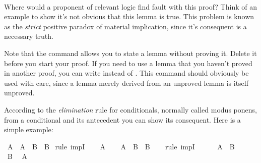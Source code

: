 \begin{isabellebody}
\isadelimproof
\ %
\endisadelimproof
%
\isatagproof
{}\isamarkupfalse%
%
\endisatagproof
{\isafoldproof}%
%
\isadelimproof
%
\endisadelimproof
%
\begin{isamarkuptext}%
Where would a proponent of relevant logic find fault with this proof? Think of an example
to show it's not obvious that this lemma is true. This problem is known as the \emph{strict} positive
paradox of material implication, since it's consequent  is a necessary truth.%
\end{isamarkuptext}\isamarkuptrue%
%
\begin{isamarkuptext}%
Note that the command  allows you to state a lemma without proving it. Delete 
it before you start your proof. If you need to use a lemma that you haven't proved in another proof, you can
write  instead of . This command should obviously be used with care,
since a lemma merely derived from an unproved lemma is itself unproved.%
\end{isamarkuptext}\isamarkuptrue%
%
\isamarkuptrue%
%
\begin{isamarkuptext}%
According to the \emph{elimination} rule for conditionals, normally called modus ponens,
from a conditional and its antecedent you can show its consequent. Here is a simple example:%
\end{isamarkuptext}\isamarkuptrue%
\isamarkupfalse%
\ {\isachardoublequoteopen}A\ {\isasymlongrightarrow}\ {\isacharparenleft}A\ {\isasymlongrightarrow}\ B{\isacharparenright}\ {\isasymlongrightarrow}\ B{\isachardoublequoteclose}\isanewline
%
\isadelimproof
%
\endisadelimproof
%
\isatagproof
{}\isamarkupfalse%
\ {\isacharparenleft}rule\ impI{\isacharparenright}\isanewline
\ \ \isamarkupfalse%
\ {\isachardoublequoteopen}A{\isachardoublequoteclose}\isanewline
\ \ \isamarkupfalse%
\ {\isachardoublequoteopen}{\isacharparenleft}A\ {\isasymlongrightarrow}\ B{\isacharparenright}\ {\isasymlongrightarrow}\ B{\isachardoublequoteclose}\isanewline
\ \ \isamarkupfalse%
\ {\isacharparenleft}rule\ impI{\isacharparenright}\isanewline
\ \ \ \ \isamarkupfalse%
\ {\isachardoublequoteopen}A\ {\isasymlongrightarrow}\ B{\isachardoublequoteclose}\isanewline
\ \ \ \ \isamarkupfalse%
\ {\isachardoublequoteopen}B{\isachardoublequoteclose}\ \isamarkupfalse%
\ {\isacharbackquoteopen}A{\isacharbackquoteclose}\ \isamarkupfalse%

\end{isabellebody}
